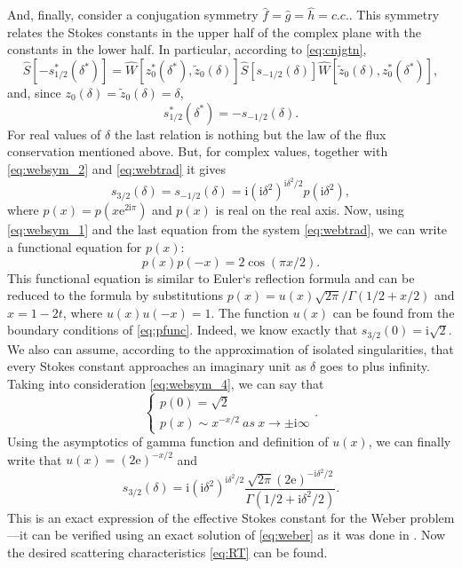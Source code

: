 \documentclass[atmp]{ipart_v1}
\def\rme{\mathrm{e}}
\def\rmi{\mathrm{i}}
\def\f{\hat{f}}
\def\g{\hat{g}}
\def\h{\hat{h}}
\def\S{\widehat{S}}
\def\W{\widehat{W}}
\newcommand\eref[1]{\eqref{#1}}
\begin{document}
And, finally, consider a conjugation symmetry $\f=\g=\h=c.c.$. This symmetry relates the 
Stokes constants in the upper half of the complex plane with the constants in the lower half. 
In particular, according to \eref{eq:cnjgtn},
\begin{equation}
\S \left[ -s_{1/2}^*(\delta^*) \right] = 
\W \left[ z_0^*(\delta^*), \tilde{z}_0(\delta) \right]
\S \left[ s_{-1/2}(\delta) \right]
\W \left[ \tilde{z}_0(\delta),z_0^*(\delta^*) \right],
\end{equation}
and, since $z_0(\delta)=\tilde{z}_0(\delta)=\delta$,
\begin{equation}
s_{1/2}^*(\delta^*)=-s_{-1/2}(\delta).
\label{eq:websym_3}
\end{equation}
For real values of $\delta$ the last relation is nothing but the law of the flux conservation 
mentioned above. But, for complex values, together with \eref{eq:websym_2} and \eref{eq:webtrad} 
it gives
\begin{equation}
s_{3/2}(\delta)=s_{-1/2}(\delta)=\rmi(\rmi \delta^2)^{\rmi \delta^2/2}p(\rmi \delta^2),
\label{eq:websym_4}
\end{equation}
where $p(x)=p(x \rme^{2\rmi\pi})$ and $p(x)$ is real on the real axis. Now, using \eref{eq:websym_1} 
and the last equation from the system \eref{eq:webtrad}, we can write a functional equation for $p(x)$:
\begin{equation}
p(x)p(-x)=2\cos(\pi x/2).
\label{eq:pfunc}
\end{equation}
This functional equation is similar to Euler`s reflection formula \cite{gamma} and can be reduced 
to the formula by substitutions $p(x)=u(x)\sqrt{2\pi}/\Gamma(1/2+x/2)$ and $x=1-2t$, where $u(x)u(-x)=1$. 
The function $u(x)$ can be found from the boundary conditions of \eref{eq:pfunc}. Indeed, we know 
exactly \cite{rwbook} that $s_{3/2}(0)=\rmi\sqrt{2}$. We also can assume, according to the approximation of 
isolated singularities\cite{rwbook,ours}, that every Stokes constant approaches an imaginary 
unit as $\delta$ goes to plus infinity. Taking into consideration \eref{eq:websym_4}, we can say that
\begin{equation}
\begin{cases} 
p(0) = \sqrt{2} \\
p(x) \sim x^{-x/2}\ as\ x \rightarrow \pm \rmi \infty 
\end{cases}.  
\end{equation}
Using the asymptotics of gamma function and definition of $u(x)$, we can finally write 
that $u(x)=(2 \rme)^{-x/2}$ and
\begin{equation}
s_{3/2}(\delta)=\rmi(\rmi\delta^2)^{\rmi\delta^2/2}
\frac{\sqrt{2\pi}(2\rme)^{-\rmi\delta^2/2}}{\Gamma(1/2+\rmi\delta^2/2)}.
\label{eq:s3/2}
\end{equation}
This is an exact expression of the effective Stokes constant for 
the Weber problem---it can be verified using 
an exact solution of \eref{eq:weber} as it was done in \cite{ours}. 
Now the desired scattering characteristics \eref{eq:RT} can be found.
\end{document}

